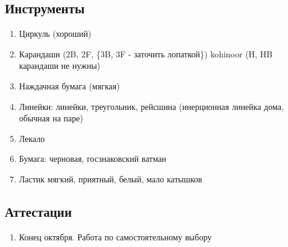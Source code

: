 \documentclass[a4paper, 11pt, oneside]{article}
\begin{document}
\subsection{Инструменты}
\begin{enumerate}
	\item Циркуль (хороший)
	\item Карандаши (2B, 2F, \{3B, 3F - заточить лопаткой\}) kohinoor (H, HB карандаши не нужны)
	\item Наждачная бумага (мягкая)
	\item Линейки: линейки, треугольник, рейсшина (инерционная линейка дома, обычная на паре)
	\item Лекало
	\item Бумага: черновая, госзнаковский ватман
	\item Ластик мягкий, приятный, белый, мало катышков
\end{enumerate}
\subsection{Аттестации}
\begin{enumerate}
	\item Конец октября. Работа по самостоятельному выбору
\end{enumerate}
\newpage
\end{document}
